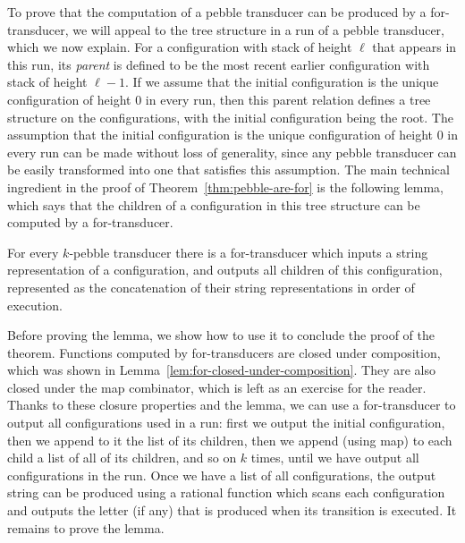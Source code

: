 To prove that the computation of a pebble transducer can be produced by a for-transducer,  we will appeal to the  tree structure in a run of a pebble transducer, which we now explain.
     For a configuration with stack of height $\ell$ that appears in this run, its \emph{parent} is defined to be the most recent earlier configuration with stack of height $\ell-1$. If we assume that the initial configuration is the unique configuration of height $0$ in every run, then  this parent relation defines a tree structure on the configurations, with the initial configuration being the root. The assumption that the initial configuration is the unique configuration of height $0$ in every run can be made without loss of generality, since any pebble transducer can be easily transformed into one that satisfies this assumption. The main technical ingredient in the proof of Theorem~\ref{thm:pebble-are-for} is the following lemma, which says that the children of a configuration in this tree structure can be computed by a for-transducer.

\begin{lemma}\label{lem:children-of-configuration-in-pebble-run}
    For every $k$-pebble transducer there  is a for-transducer which inputs a string representation of a configuration, and outputs all children of this configuration, represented as the concatenation of their string representations in order of execution. 
\end{lemma}

Before proving the lemma, we show how to use it to conclude the proof of the theorem. Functions computed by for-transducers are closed under composition, which was shown in Lemma~\ref{lem:for-closed-under-composition}. They are also closed under the map combinator, which is left as an exercise for the reader. Thanks to these closure properties and the lemma, we can use a for-transducer to output all configurations used in a run: first we output the initial configuration, then we append to it the list of its children, then we append (using map) to each child a list of all of its children, and so on $k$ times, until we have output all configurations in the run. Once we have a list of all configurations, the output string can be produced using a rational function which scans each configuration and outputs the letter (if any) that is produced when its transition is executed. It remains to prove the lemma.


